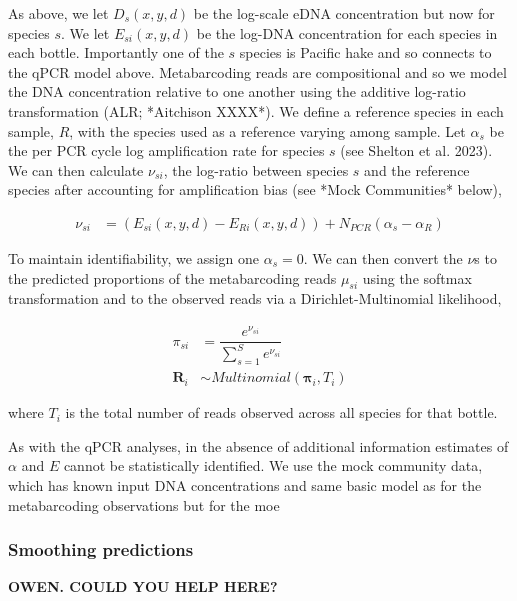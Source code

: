\documentclass{article}
\begin{document}
As above, we let $D_s(x,y,d)$ be the log-scale eDNA concentration but now for species $s$. We let $E_{si}(x,y,d)$ be the log-DNA concentration for each species in each bottle. Importantly one of the $s$ species is Pacific hake and so connects to the qPCR model above. Metabarcoding reads are compositional and so we model the DNA concentration relative to one another using the additive log-ratio transformation (ALR; *Aitchison XXXX*).  We define a reference species in each sample, $R$, with the species used as a reference varying among sample. Let $\alpha_s$ be the per PCR cycle log amplification rate for species $s$ (see Shelton et al. 2023).  We can then calculate $\nu_{si}$, the log-ratio between species $s$ and the reference species after accounting for amplification bias (see *Mock Communities* below),

\begin{align} 
  \nu_{si} &= \left( E_{si}(x,y,d) - E_{Ri}(x,y,d)\right) + N_{PCR} \left(\alpha_s - \alpha_R \right) 
\end{align}

To maintain identifiability, we assign one $\alpha_s = 0$. We can then convert the $\nu$s to the predicted proportions of the metabarcoding reads $\mu_{si}$ using the softmax transformation and to the observed reads via a Dirichlet-Multinomial likelihood,

\begin{align} 
  \pi_{si} &= \dfrac{e^{\nu_{si}}}{\sum_{s=1}^S e^{\nu_{si}}} \\
  \boldsymbol{R}_{i} & \sim Multinomial\left(\boldsymbol{\pi}_{i},T_{i}\right) 
\end{align}

where $T_{i}$ is the total number of reads observed across all species for that bottle. 

As with the qPCR analyses, in the absence of additional information estimates of $\alpha$ and $E$ cannot be statistically identified.  We use the mock community data, which has known input DNA concentrations and  same basic model as for the metabarcoding observations but for the moe

\subsubsection*{Smoothing predictions}

\textbf{OWEN.  COULD YOU HELP HERE?}
\end{document}
